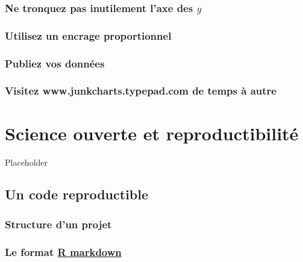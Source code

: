\documentclass[]{book}
\begin{document}
\hypertarget{ne-tronquez-pas-inutilement-laxe-des-y}{%
\subsection{\texorpdfstring{Ne tronquez pas inutilement l'axe des
\(y\)}{Ne tronquez pas inutilement l'axe des y}}\label{ne-tronquez-pas-inutilement-laxe-des-y}}

\hypertarget{utilisez-un-encrage-proportionnel}{%
\subsection{Utilisez un encrage
proportionnel}\label{utilisez-un-encrage-proportionnel}}

\hypertarget{publiez-vos-donnuxe9es}{%
\subsection{Publiez vos données}\label{publiez-vos-donnuxe9es}}

\hypertarget{visitez-www.junkcharts.typepad.com-de-temps-uxe0-autre}{%
\subsection{Visitez www.junkcharts.typepad.com de temps à
autre}\label{visitez-www.junkcharts.typepad.com-de-temps-uxe0-autre}}

\hypertarget{chapitre-git}{%
\chapter{Science ouverte et reproductibilité}\label{chapitre-git}}

Placeholder

\hypertarget{un-code-reproductible}{%
\section{Un code reproductible}\label{un-code-reproductible}}

\hypertarget{structure-dun-projet}{%
\subsection{Structure d'un projet}\label{structure-dun-projet}}

\hypertarget{le-format-r-markdown}{%
\subsection{\texorpdfstring{Le format
\href{https://rmarkdown.rstudio.com/}{R
markdown}}{Le format R markdown}}\label{le-format-r-markdown}}
\end{document}
